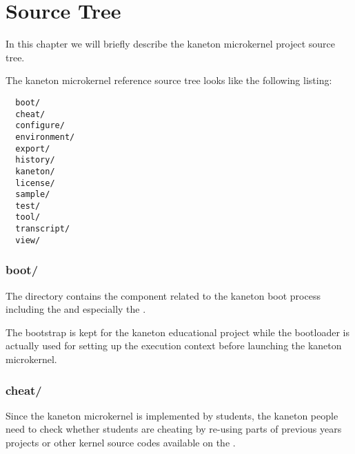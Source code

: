%
%
%
%
%
%

%
%

\chapter{Source Tree}
\label{chapter:source tree}

In this chapter we will briefly describe the kaneton microkernel project
source tree.

\newpage

%
%

The kaneton microkernel reference source tree looks like the following
listing:

\begin{verbatim}
  boot/
  cheat/
  configure/
  environment/
  export/
  history/
  kaneton/
  license/
  sample/
  test/
  tool/
  transcript/
  view/
\end{verbatim}

%
%

\subsection*{boot/}

The  directory contains the component related to the kaneton
boot process including the  and especially the
.

The bootstrap is kept for the kaneton educational project while the bootloader
is actually used for setting up the execution context before launching
the kaneton microkernel.

%
%

\subsection*{cheat/}

Since the kaneton microkernel is implemented by students, the kaneton
people need to check whether students are cheating by re-using parts of
previous years projects or other kernel source codes available on the
.

